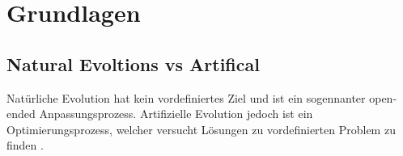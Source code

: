 %
%


\chapter{Grundlagen}

\section{Natural Evoltions vs Artifical}
  Natürliche Evolution hat kein vordefiniertes Ziel und ist ein sogennanter open-ended Anpassungsprozess. Artifizielle Evolution jedoch ist ein Optimierungsprozess, welcher versucht Lösungen zu vordefinierten Problem zu finden \cite[S.1]{book:bioInspired}. \\

